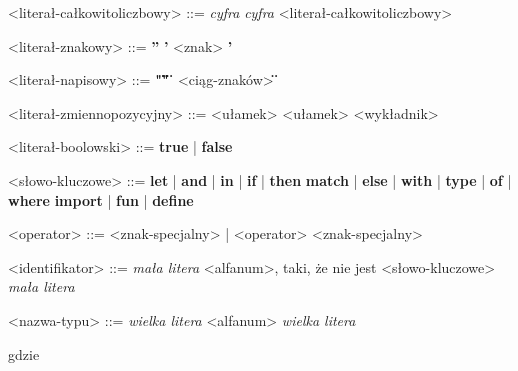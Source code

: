 \documentclass[12pt]{article}
\begin{document}
\begin{grammar}

<literał-całkowitoliczbowy> ::=
    \textit{cyfra} 
    \alt \textit{cyfra} <literał-całkowitoliczbowy>

<literał-znakowy> ::=
    \textbf{''}
    \alt \textbf{'} <znak> \textbf{'}

<literał-napisowy> ::=
    \textbf{"\"\""}
    \alt \textbf{\"} <ciąg-znaków> \textbf{\"}

<literał-zmiennopozycyjny> ::=
    <ułamek>
    \alt <ułamek> <wykładnik>

<literał-boolowski> ::=
    \textbf{true}
    | \textbf{false}

<słowo-kluczowe> ::=
    \textbf{let}
    | \textbf{and}
    | \textbf{in}
    | \textbf{if}
    | \textbf{then}
    \alt \textbf{match}
    | \textbf{else}
    | \textbf{with}
    | \textbf{type}
    | \textbf{of}
    | \textbf{where}
    \alt \textbf{import}
    | \textbf{fun}
    | \textbf{define}

<operator> ::= <znak-specjalny> | <operator> <znak-specjalny>

<identifikator> ::= 
    \textit{mała litera} <alfanum>, taki, że nie jest <słowo-kluczowe>
    \alt \textit{mała litera}

<nazwa-typu> ::=
    \textit{wielka litera} <alfanum>
    \alt \textit{wielka litera}

\end{grammar}

gdzie\\
\end{document}
